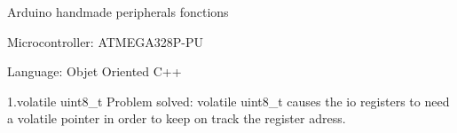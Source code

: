 Arduino handmade peripherals fonctions

Microcontroller\-: A\-T\-M\-E\-G\-A328\-P-\/\-P\-U

Language\-: Objet Oriented C++

1.\-volatile uint8\-\_\-t Problem solved\-: volatile uint8\-\_\-t causes the io registers to need a volatile pointer in order to keep on track the register adress. 